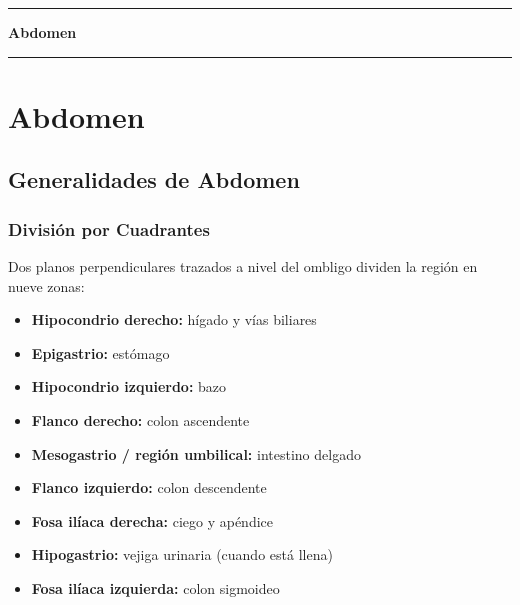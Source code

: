 \clearpage
\onecolumn
\thispagestyle{empty}
\vspace*{\fill}
\begin{center}
	{\color{radblue}\rule{\linewidth}{2pt}}\par
	\vspace{6mm}
	{\Huge\bfseries\color{radblue} Abdomen}\par
	\vspace{6mm}
	{\color{radblue}\rule{\linewidth}{2pt}}
\end{center}
\vspace*{\fill}
\clearpage
\twocolumn
\pagestyle{contenido}


	
	\section{Abdomen}
	\subsection{Generalidades de Abdomen}
	
	
	\subsubsection*{División por Cuadrantes}
	
	Dos planos perpendiculares trazados a nivel del ombligo dividen la región en nueve zonas:
	
	\begin{itemize}
		\item \textbf{Hipocondrio derecho:} hígado y vías biliares
		\item \textbf{Epigastrio:} estómago
		\item \textbf{Hipocondrio izquierdo:} bazo
		\item \textbf{Flanco derecho:} colon ascendente
		\item \textbf{Mesogastrio / región umbilical:} intestino delgado
		\item \textbf{Flanco izquierdo:} colon descendente
		\item \textbf{Fosa ilíaca derecha:} ciego y apéndice
		\item \textbf{Hipogastrio:} vejiga urinaria (cuando está llena)
		\item \textbf{Fosa ilíaca izquierda:} colon sigmoideo
	\end{itemize}
	
